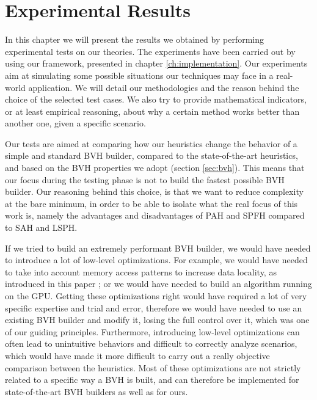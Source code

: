 \documentclass{PoliMi_MasterThesis}
\begin{document}
\chapter{Experimental Results} \label{ch:experimental_results}
In this chapter we will present the results we obtained by performing experimental tests on our theories. The experiments have been carried out by using our framework, presented in chapter \ref{ch:implementation}. Our experiments aim at simulating some possible situations our techniques may face in a real-world application. We will detail our methodologies and the reason behind the choice of the selected test cases. We also try to provide mathematical indicators, or at least empirical reasoning, about why a certain method works better than another one, given a specific scenario.

Our tests are aimed at comparing how our heuristics change the behavior of a simple and standard BVH builder, compared to the state-of-the-art heuristics, and based on the BVH properties we adopt (section \ref{sec:bvh}). This means that our focus during the testing phase is not to build the fastest possible BVH builder. Our reasoning behind this choice, is that we want to reduce complexity at the bare minimum, in order to be able to isolate what the real focus of this work is, namely the advantages and disadvantages of PAH and SPFH compared to SAH and LSPH.

If we tried to build an extremely performant BVH builder, we would have needed to introduce a lot of low-level optimizations. For example, we would have needed to take into account memory access patterns to increase data locality, as introduced in this paper \cite{TODO}; or we would have needed to build an algorithm running on the GPU. Getting these optimizations right would have required a lot of very specific expertise and trial and error, therefore we would have needed to use an existing BVH builder and modify it, losing the full control over it, which was one of our guiding principles. Furthermore, introducing low-level optimizations can often lead to unintuitive behaviors and difficult to correctly analyze scenarios, which would have made it more difficult to carry out a really objective comparison between the heuristics. Most of these optimizations are not strictly related to a specific way a BVH is built, and can therefore be implemented for state-of-the-art BVH builders as well as for ours.
\end{document}
